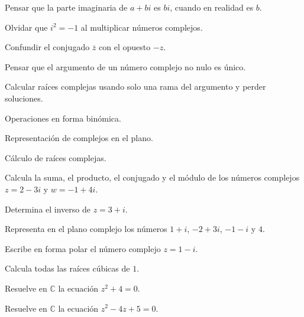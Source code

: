\begin{erroresfrecuentes}
  \item Pensar que la parte imaginaria de \(a+bi\) es \(bi\), cuando en realidad es \(b\).
  \item Olvidar que \(i^2=-1\) al multiplicar números complejos.
  \item Confundir el conjugado \(\overline{z}\) con el opuesto \(-z\).
  \item Pensar que el argumento de un número complejo no nulo es único.
  \item Calcular raíces complejas usando solo una rama del argumento y perder soluciones.
\end{erroresfrecuentes}

\begin{seminario}
  \item Operaciones en forma binómica.
  \item Representación de complejos en el plano.
  \item Cálculo de raíces complejas.
\end{seminario}

\begin{ejerciciospropuestos}
  \item Calcula la suma, el producto, el conjugado y el módulo de los números complejos \(z=2-3i\) y \(w=-1+4i\).
  \item Determina el inverso de \(z=3+i\).
  \item Representa en el plano complejo los números \(1+i\), \(-2+3i\), \(-1-i\) y \(4\).
  \item Escribe en forma polar el número complejo \(z=1-i\).
  \item Calcula todas las raíces cúbicas de \(1\).
  \item Resuelve en \(\mathbb{C}\) la ecuación \(z^2+4=0\).
  \item Resuelve en \(\mathbb{C}\) la ecuación \(z^2-4z+5=0\).
\end{ejerciciospropuestos}

